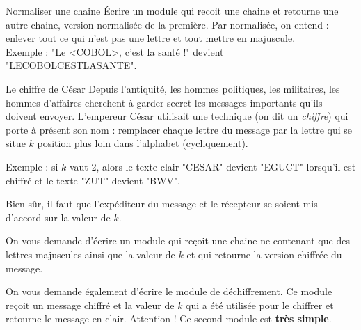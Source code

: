 \begin{Exercice}{Normaliser une chaine}
	Écrire un module qui recoit une chaine et retourne une autre chaine,
	version normalisée de la première.
	Par normalisée, on entend : enlever tout ce qui n'est pas une lettre 
	et tout mettre en majuscule.
	\\Exemple : "Le <COBOL>, c'est la santé !" devient "LECOBOLCESTLASANTE".
\end{Exercice}

\begin{Exercice}{Le chiffre de César}
	\label{ex:cesar}
	Depuis l'antiquité, les hommes politiques, les militaires, 
	les hommes d'affaires cherchent à garder secret les messages
	importants qu'ils doivent envoyer.
	L'empereur César utilisait une technique (on dit un \emph{chiffre})
	qui porte à présent son nom :
	remplacer chaque lettre du message par la lettre qui se situe 
	$k$ position plus loin dans l'alphabet (cycliquement).
	
	Exemple : si $k$ vaut $2$, 
	alors le texte clair "CESAR" devient "EGUCT" lorsqu'il est chiffré 
	et le texte "ZUT" devient "BWV".
	
	Bien sûr, il faut que l'expéditeur du message et le récepteur
	se soient mis d'accord sur la valeur de $k$.
	
	On vous demande d'écrire un module qui reçoit une chaine ne contenant
	que des lettres majuscules ainsi que la valeur de $k$ et qui retourne
	la version chiffrée du message.

	On vous demande également d'écrire le module de déchiffrement.
	Ce module reçoit un message chiffré et la valeur de $k$ qui a été
	utilisée pour le chiffrer et retourne le message en clair.
	Attention ! Ce second module est \textbf{très simple}.

	\begin{Solution}
	\end{Solution}
	
\end{Exercice}



